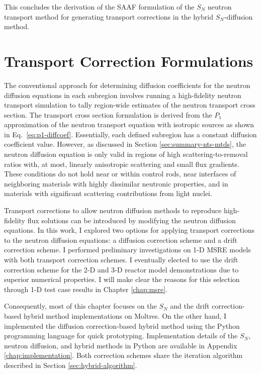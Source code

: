 This concludes the derivation of the \gls{SAAF} formulation of the $S_N$ neutron transport method
for generating transport corrections in the hybrid $S_N$-diffusion method.

\section{Transport Correction Formulations} \label{sec:transport-correction}

The conventional approach for determining diffusion coefficients for the neutron diffusion
equations in each subregion involves
running a high-fidelity neutron transport simulation to tally region-wide estimates of the neutron
transport cross section. The transport cross section formulation is derived from the $P_1$
approximation of the neutron transport equation with isotropic sources \cite{bell_nuclear_1970} as
shown in Eq.\ \ref{eq:p1-diffcoef}.
Essentially, each defined subregion has a constant diffusion coefficient value. However, as
discussed in Section \ref{sec:summary-nts-mtds}, the neutron diffusion
equation is only valid in regions of high scattering-to-removal ratios with, at most, linearly
anisotropic scattering and small flux gradients. These conditions do not hold near or within
control rods, near interfaces of neighboring materials with highly dissimilar neutronic properties,
and in materials with significant scattering contributions from light nuclei.

Transport corrections to allow neutron diffusion methods to reproduce high-fidelity flux solutions
can be introduced by modifying the neutron diffusion equations.
In this work, I explored two options for applying transport corrections to the neutron diffusion
equations: a diffusion correction scheme and a drift correction scheme.
I performed preliminary investigations on 1-D \gls{MSRE} models with both transport correction
schemes. I eventually elected to use the drift correction scheme for the 2-D and 3-D reactor model
demonstrations due to superior numerical properties. I will make clear the reasons for this
selection through 1-D test case results in Chapter \ref{chap:msre}.

Consequently, most of this chapter focuses on the $S_N$ and the drift correction-based hybrid
method implementations on Moltres. On the other hand, I implemented the diffusion correction-based
hybrid method using the Python programming language for quick
prototyping. Implementation details of the $S_N$, neutron diffusion, and hybrid methods in Python
are available in Appendix \ref{chap:implementation}. Both correction schemes share the iteration
algorithm described in Section \ref{sec:hybrid-algorithm}.

